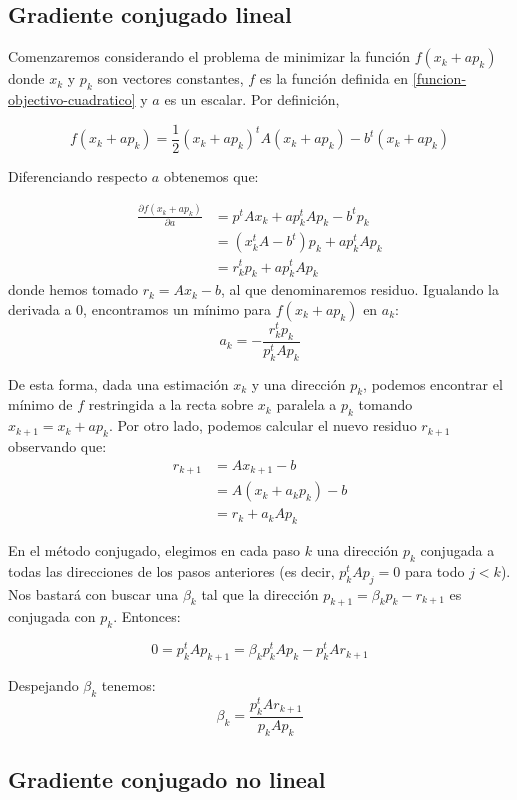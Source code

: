 \subsection{Gradiente conjugado lineal}
Comenzaremos considerando el problema de minimizar la función $f(x_k+ap_k)$ donde $x_k$ y $p_k$ son vectores constantes, $f$ es la función definida en \eqref{funcion-objectivo-cuadratico} y $a$ es un escalar. Por definición,

\[ f(x_k+ap_k) = \frac{1}{2} (x_k+ap_k)^t A (x_k+ap_k)-b^t(x_k+ap_k) \]

Diferenciando respecto $a$ obtenemos que:

\begin{align*} \frac{\partial f(x_k+ap_k)}{\partial a} &= p^tAx_k + ap_k^tAp_k -b^tp_k\\
	& = (x_k^tA-b^t)p_k +ap_k^tAp_k\\
	& = r_k^tp_k+ap_k^tAp_k
\end{align*}
donde hemos tomado $r_k = Ax_k-b$, al que denominaremos residuo.
Igualando la derivada a $0$, encontramos un mínimo para $f(x_k+ap_k)$ en $a_k$:
\[ a_k = -\frac{r_k^tp_k}{p_k^tAp_k}\]

De esta forma, dada una estimación $x_k$ y una dirección $p_k$, podemos encontrar el mínimo de $f$ restringida a la recta sobre $x_k$ paralela a $p_k$ tomando $x_{k+1} = x_k + ap_k$. Por otro lado, podemos calcular el nuevo residuo $r_{k+1}$ observando que:
\begin{align}
	r_{k+1} &= Ax_{k+1}-b\nonumber\\
	& = A(x_k+a_kp_k)-b\nonumber\\
	& =r_k+a_kAp_k\label{conj-cuad-resid}
\end{align}

En el método conjugado, elegimos en cada paso $k$ una dirección $p_k$ conjugada a todas las direcciones de los pasos anteriores (es decir, $p_k^tAp_j=0$ para todo $j<k$). Nos bastará con buscar una $\beta_k$ tal que la dirección $p_{k+1}=\beta_kp_k-r_{k+1}$ es conjugada con $p_k$. Entonces:

\[ 0=p_k^tAp_{k+1} = \beta_kp_k^tAp_k-p_k^tAr_{k+1}\]

Despejando $\beta_k$ tenemos:
\[ \beta_k = \frac{p_k^tAr_{k+1}}{p_kAp_k} \]

\subsection{Gradiente conjugado no lineal}

